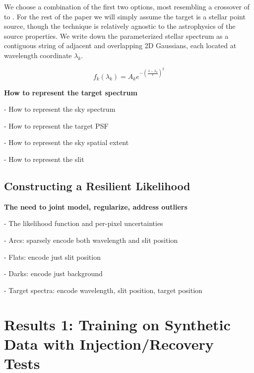 \documentclass[twocolumn]{aastex631}
\begin{document}
We choose a combination of the first two options, most resembling a crossover of  \citet{2010PASP..122..248B} to \citet{2019AJ....158..164B}.  For the rest of the paper we will simply assume the target is a stellar point source, though the technique is relatively agnostic to the astrophysics of the source properties.  We write down the parameterized stellar spectrum as a contiguous string of adjacent and overlapping 2D Gaussians, each located at wavelength coordinate $\lambda_k$.

\begin{equation}
  f_k(\lambda_k) = A_k e^{-\left (\frac{\lambda - \lambda_k}{\epsilon} \right )^2}
\end{equation}


\begin{mdframed}
  \textbf{How to represent the target spectrum} \par
  - How to represent the sky spectrum\par
  - How to represent the target PSF\par
  - How to represent the sky spatial extent\par
  - How to represent the slit\par
\end{mdframed}


\subsection{Constructing a Resilient Likelihood}
\begin{mdframed}
  \textbf{The need to joint model, regularize, address outliers} \par
  - The likelihood function and per-pixel uncertainties\par
  - Arcs: sparsely encode both wavelength and slit position\par
  - Flats: encode just slit position\par
  - Darks: encode just background\par
  - Target spectra: encode wavelength, slit position, target position\par
  \textcolor{lightgray}{\lipsum[7]}
\end{mdframed}


\section{Results 1: Training on Synthetic Data with Injection/Recovery Tests} \label{results1Synthetic}
\end{document}
